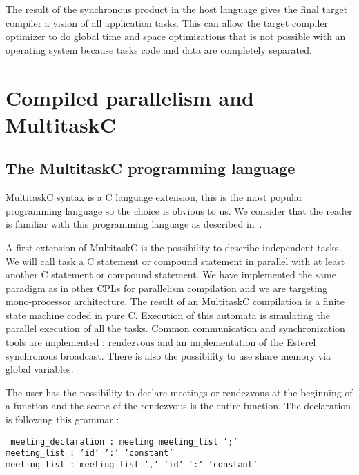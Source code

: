 \documentclass[10pt]{report}
\begin{document}
The result of the synchronous product in the host language gives the final target compiler a vision of all
application tasks. This can allow the target compiler optimizer to do global time and space optimizations that
is not possible with an operating system because tasks code and data are completely separated.

\chapter{Compiled parallelism and MultitaskC}
\label{sec:cp}

\section{The MultitaskC programming language}

MultitaskC syntax is a C language extension, this is the most popular programming language so the choice is obvious
to us. We consider that the reader is familiar with this programming language as described in~\cite{KR:88}.

A first extension of MultitaskC is the possibility to describe independent tasks. We will call task a C statement or
compound statement in parallel with at least another C statement or compound statement. We have implemented the same
paradigm as in other CPLs for parallelism compilation and we are targeting mono-processor architecture. The result of
an MultitaskC compilation is a finite state machine coded in pure C. Execution of this automata is simulating
the parallel execution of all the tasks. Common communication and synchronization tools are implemented : rendezvous
and an implementation of the Esterel synchronous broadcast. There is also the possibility to use share
memory via global variables.

The user has the possibility to declare meetings or rendezvous at the beginning of a function and the scope
of the rendezvous is the entire function. The declaration is following this grammar :

\begin{table}[h!]
\tt
\footnotesize
meeting\_declaration : meeting meeting\_list ';'\\
meeting\_list : 'id' ':' 'constant'\\
meeting\_list : meeting\_list ',' 'id' ':' 'constant'\\
\end{table}
\end{document}
